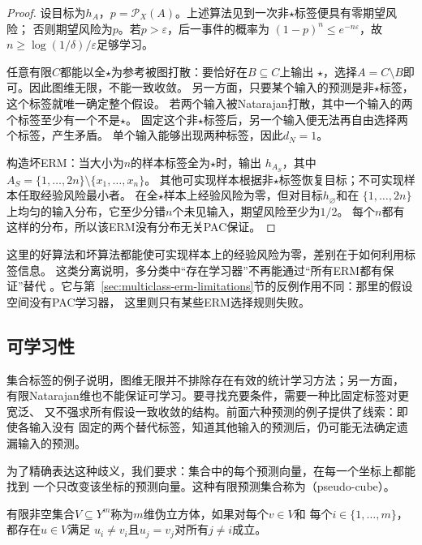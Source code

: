 \begin{proof}
设目标为$h_A$，$p=\mathcal P_X(A)$。上述算法见到一次非$\star$标签便具有零期望风险；
否则期望风险为$p$。若$p>\varepsilon$，后一事件的概率为
$(1-p)^n\leq e^{-n\varepsilon}$，故$n\geq\log(1/\delta)/\varepsilon$足够学习。

任意有限$C$都能以全$\star$为参考被图打散：要恰好在$B\subseteq C$上输出
$\star$，选择$A=C\setminus B$即可。因此图维无限，不能一致收敛。
另一方面，只要某个输入的预测是非$\star$标签，这个标签就唯一确定整个假设。
若两个输入被Natarajan打散，其中一个输入的两个标签至少有一个不是$\star$。
固定这个非$\star$标签后，另一个输入便无法再自由选择两个标签，产生矛盾。
单个输入能够出现两种标签，因此$d_N=1$。

构造坏ERM：当大小为$n$的样本标签全为$\star$时，输出
$h_{A_S}$，其中$A_S=\{1,\ldots,2n\}\setminus\{x_1,\ldots,x_n\}$。
其他可实现样本根据非$\star$标签恢复目标；不可实现样本任取经验风险最小者。
在全$\star$样本上经验风险为零，但对目标$h_{\varnothing}$和在
$\{1,\ldots,2n\}$上均匀的输入分布，它至少分错$n$个未见输入，期望风险至少为$1/2$。
每个$n$都有这样的分布，所以该ERM没有分布无关PAC保证。
\end{proof}

这里的好算法和坏算法都能使可实现样本上的经验风险为零，差别在于如何利用标签信息。
这类分离说明，多分类中“存在学习器”不再能通过“所有ERM都有保证”替代
。它与第~\ref{sec:multiclass-erm-limitations}节的反例作用不同：那里的假设空间没有PAC学习器，
这里则只有某些ERM选择规则失败。

\subsection{可学习性}

集合标签的例子说明，图维无限并不排除存在有效的统计学习方法；另一方面，
有限Natarajan维也不能保证可学习。要寻找充要条件，需要一种比固定标签对更宽泛、
又不强求所有假设一致收敛的结构。前面六种预测的例子提供了线索：即使各输入没有
固定的两个替代标签，知道其他输入的预测后，仍可能无法确定遗漏输入的预测。

\label{sec:ds-dimension}

为了精确表达这种歧义，我们要求：集合中的每个预测向量，在每一个坐标上都能找到
一个只改变该坐标的预测向量。这种有限预测集合称为（pseudo-cube）。

\begin{definition}[伪立方体]
\label{def:pseudocube}
有限非空集合$V\subseteq Y^m$称为$m$维伪立方体，如果对每个$v\in V$和
每个$i\in\{1,\ldots,m\}$，都存在$u\in V$满足
$u_i\neq v_i$且$u_j=v_j$对所有$j\neq i$成立。
\end{definition}

